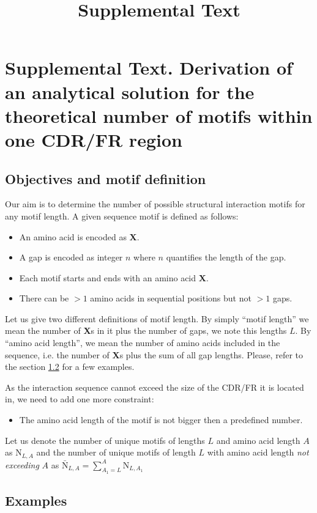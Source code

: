 \documentclass[fleqn, oneside, listof=totoc,%
 bibliography=totoc, paper=A4]{scrartcl}[2007/12/24]
\title{Supplemental Text}
\begin{document}
\section{Supplemental Text. Derivation of an analytical solution for the theoretical number of motifs within one CDR/FR region}
\label{sec:entr-relat-proofs}

\subsection{Objectives and motif definition}
\label{sec:objectives}


Our aim is to determine the number of possible structural interaction motifs for any motif
length. A given sequence motif is defined as follows:

\begin{itemize}
\item An amino acid is encoded as \textbf{X}.
\item A gap is encoded as integer $n$ where $n$ quantifies the length of the gap. 
\item Each motif starts and ends with an amino acid \textbf{X}.
\item There can be $>1$ amino acids in sequential positions but not $>1$ gaps.
\end{itemize}
Let us give two different definitions of motif length. By simply ``motif length'' we mean 
the number of \textbf{X}s in it plus the number of gaps, we note this lengths $L$. 
By ``amino acid length'', we mean the number of amino acids included in the sequence, 
i.e. the number of \textbf{X}s plus the sum of all gap lengths. Please, refer to the section \ref{sec:examples} for a few examples.

As the interaction sequence cannot exceed the size of the CDR/FR it is located in, we need to add one more constraint:
\begin{itemize}
\item The amino acid length of the motif is not bigger then a predefined number.
\end{itemize}

Let us denote the number of unique motifs of lengths $L$ and amino acid length $A$ as $\mathrm{N}_{L, A}$ 
and the number of unique motifs of length $L$ with amino acid length \textit{not exceeding} $A$ as $\bar{\mathrm{N}}_{L, A} = \sum_{A_1=L}^A \mathrm{N}_{L, A_1}$


\subsection{Examples}
\label{sec:examples}
\end{document}
